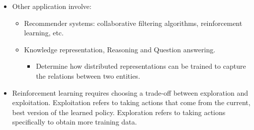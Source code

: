 \documentclass{article}
\begin{document}
\begin{itemize}
\begin{itemize}
\end{itemize}
\item Other application involve:
\begin{itemize}
\item Recommender systems: collaborative filtering algorithms, reinforcement learning, etc.
\item Knowledge representation, Reasoning and Question answering.
\begin{itemize}
\item Determine how distributed representations can be trained to capture the relations between two entities.
\end{itemize}
\end{itemize}
\item Reinforcement learning requires choosing a trade-off between exploration and exploitation. Exploitation refers to taking actions that come from the current, best version of the learned policy. Exploration refers to taking actions specifically to obtain more training data.
\end{itemize}
\end{document}
